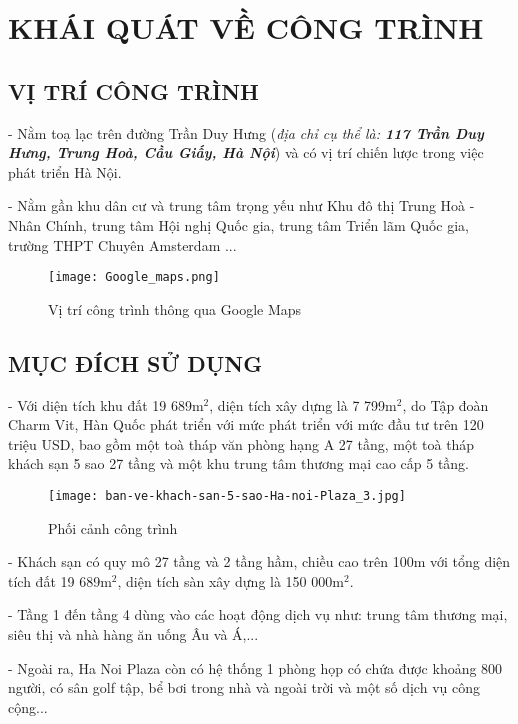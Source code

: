 \fancyhead[L]{\leftmark}

	\section{KHÁI QUÁT VỀ CÔNG TRÌNH}
	\subsection{VỊ TRÍ CÔNG TRÌNH}
	- Nằm toạ lạc trên đường Trần Duy Hưng (\emph{địa chỉ cụ thể là: \textbf{117 Trần Duy Hưng, Trung Hoà, Cầu Giấy, Hà Nội}}) và có vị trí chiến lược trong việc phát triển Hà Nội.
	
	 - Nằm gần khu dân cư và trung tâm trọng yếu như Khu đô thị Trung Hoà - Nhân Chính, trung tâm Hội nghị Quốc gia, trung tâm Triển lãm Quốc gia, trường THPT Chuyên Amsterdam ...

\begin{figure}[H]
	\centering
	\texttt{[image: Google\_maps.png]}
	\caption{Vị trí công trình thông qua Google Maps}
\end{figure}
	
	\subsection{MỤC ĐÍCH SỬ DỤNG}
	- Với diện tích khu đất 19 689m$^{2}$, diện tích xây dựng là 7 799m$^{2}$, do Tập đoàn Charm Vit, Hàn Quốc phát triển với mức phát triển với mức đầu tư trên 120 triệu USD, bao gồm một toà tháp văn phòng hạng A 27 tầng, một toà tháp khách sạn 5 sao 27 tầng và một khu trung tâm thương mại cao cấp 5 tầng.

\begin{figure}[H]
	\centering
	\texttt{[image: ban-ve-khach-san-5-sao-Ha-noi-Plaza\_3.jpg]}
	\caption{Phối cảnh công trình}
\end{figure}

	- Khách sạn có quy mô 27 tầng và 2 tầng hầm, chiều cao trên 100m với tổng diện tích đất 19 689m$^{2}$, diện tích sàn xây dựng là 150 000m$^{2}$.
	
	- Tầng 1 đến tầng 4 dùng vào các hoạt động dịch vụ như: trung tâm thương mại, siêu thị và nhà hàng ăn uống Âu và Á,...
	
	- Ngoài ra, Ha Noi Plaza còn có hệ thống 1 phòng họp có chứa được khoảng 800 người, có sân golf tập, bể bơi trong nhà và ngoài trời và một số dịch vụ công cộng...
		

